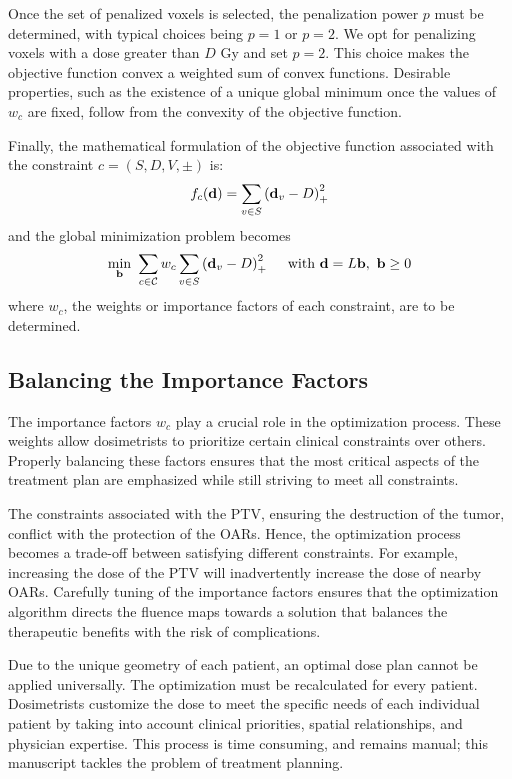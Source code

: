 Once the set of penalized voxels is selected, the penalization power $p$ must be determined, with typical choices being $p=1$ or $p=2$.
We opt for penalizing voxels with a dose greater than $D$ Gy and set $p=2$.
This choice makes the objective function convex a weighted sum of convex functions.
Desirable properties, such as the existence of a unique global minimum once the values of $w_c$ are fixed, follow from the convexity of the objective function.

Finally, the mathematical formulation of the objective function associated with the constraint $c = \left( S, D, V, \pm \right)$ is:
$$f_c(\mathbf{d}) = \sum_{v \in S} \left( {\mathbf{d}_v - D} \right)_+^2$$
and the global minimization problem becomes
$$
\min_{\mathbf{b}} \ \sum_{c \in \mathcal{C}} w_c \sum_{v \in S} \left( {\mathbf{d}_v - D} \right)_+^2
\quad \text{ with }
\mathbf{d} = L\mathbf{b}, \ \mathbf{b} \geq 0
$$
where $w_c$, the weights or importance factors of each constraint, are to be determined.

\subsection{Balancing the Importance Factors}
The importance factors $w_c$ play a crucial role in the optimization process.
These weights allow dosimetrists to prioritize certain clinical constraints over others.
Properly balancing these factors ensures that the most critical aspects of the treatment plan are emphasized while still striving to meet all constraints.

The constraints associated with the PTV, ensuring the destruction of the tumor, conflict with the protection of the OARs.
Hence, the optimization process becomes a trade-off between satisfying different constraints.
For example, increasing the dose of the PTV will inadvertently increase the dose of nearby OARs.
Carefully tuning of the importance factors ensures that the optimization algorithm directs the fluence maps towards a solution that balances the therapeutic benefits with the risk of complications.

Due to the unique geometry of each patient, an optimal dose plan cannot be applied universally.
The optimization must be recalculated for every patient.
Dosimetrists customize the dose to meet the specific needs of each individual patient by taking into account clinical priorities, spatial relationships, and physician expertise.
This process is time consuming, and remains manual; this manuscript tackles the problem of treatment planning.

